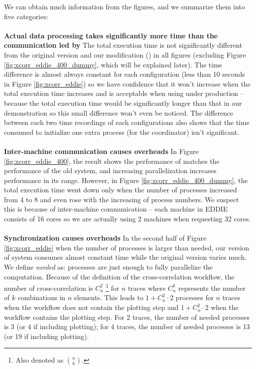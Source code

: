 We can obtain much information from the figures, and we summarize them into five categories: \\\\
\textbf{Actual data processing takes significantly more time than the communication led by \tincdep}\quad
The total execution time is not significantly different from the original \dpy version and our modification (\tincdep) in all figures (excluding Figure \ref{fig:xcorr_eddie_400_dummy}, which will be explained later). The time difference is almost always constant for each configuration (\eg less than 10 seconds in Figure \ref{fig:xcorr_eddie}) so we have confidence that it won't increase when the total execution time increases and is acceptable when using under production -- because the total execution time would be significantly longer than that in our demonstration so this small difference won't even be noticed. The difference between each two time recordings of each configurations also shows that the time consumed to initialize one extra process (for the coordinator) isn't significant. \\\\
\textbf{Inter-machine communication causes overheads}\quad
In Figure \ref{fig:xcorr_eddie_400}, the result shows the performance of \tincdep matches the performance of the old system, and increasing parallelization increases performance in its range. However, in Figure \ref{fig:xcorr_eddie_400_dummy}, the total execution time went down only when the number of processes increased from 4 to 8 and even rose with the increasing of process numbers. We suspect this is because of inter-machine communication -- each machine in EDDIE consists of 16 cores so we are actually using 2 machines when requesting 32 cores. \\\\
\textbf{Synchronization causes overheads}\quad
In the second half of Figure \ref{fig:xcorr_eddie} when the number of processes is larger than needed, our version of system consumes almost constant time while the original version varies much. We define \emph{needed} as: processes are just enough to fully parallelize the computation. Because of the definition of the cross-correlation workflow, the number of cross-correlation is $C^2_n$ \footnote{Also denoted as $\binom{n}{k}$.} for $n$ traces where $C^k_n$ represents the number of $k$ combinations in $n$ elements. This leads to $1+C^2_n \cdot 2$ processes for $n$ traces when the workflow does not contain the plotting step and $1+C^2_n \cdot 2$ when the workflow contains the plotting step. For 2 traces, the number of needed processes is 3 (or 4 if including plotting); for 4 traces, the number of needed processes is 13 (or 19 if including plotting).

